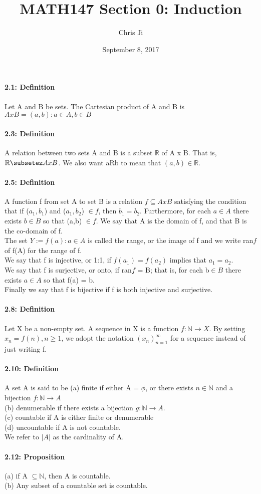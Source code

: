 \documentclass{article}
\title{MATH147 Section 0: Induction}  %
\author{Chris Ji}      %
\date{September 8, 2017}      %
\begin{document}
            

\maketitle     %

\paragraph{2.1: Definition}
Let A and B be sets. The Cartesian product of A and B is \\ 
$A x B = {(a,b): a \in A, b \in B}$

\paragraph{2.3: Definition}
A relation between two sets A and B is a subset $\mathbb{R}$ of A x B. That is, $\mathbb{R} \subsetez A x B$. We also want aRb to mean that $(a,b) \in \mathbb{R}$.

\paragraph{2.5: Definition}
A function f from set A to set B is a relation $f \subseteq A x B$ satisfying the condition that if ($a_1, b_1$) and ($a_1, b_2$) $\in f$, then $b_1 = b_2$. Furthermore, for each $a \in A$ there exists $b \in B$ so that (a,b) $\in f$. We say that A is the domain of f, and that B is the co-domain of f. \\
The set $Y:= {f(a): a \in A}$ is called the range, or the image of f and we write ran$f$ of f(A) for the range of f. \\
We say that f is injective, or 1:1, if $f(a_1) = f(a_2)$ implies that $a_1 = a_2$. \\ 
We say that f is surjective, or onto, if ran$f$ = B; that is, for each b$\in B$ there exists $a \in A$ so that f(a) = b. \\ 
Finally we say that f is bijective if f is both injective and surjective.

\paragraph{2.8: Definition}
Let X be a non-empty set. A sequence in X is a function $f: \mathbb{N} \rightarrow X$. By setting $x_n = f(n), n \geq 1$, we adopt the notation $(x_n)_{n=1}^\infty$ for a sequence instead of just writing f.

\paragraph{2.10: Definition}
A set A is said to be
(a) finite if either A = $\phi$, or there exists $n \in \mathbb{N}$ and a bijection $f: \mathbb{N} \rightarrow A$ \\
(b) denumerable if there exists a bijection $g: \mathbb{N} \rightarrow A$.\\ 
(c) countable if A is either finite or denumerable \\ 
(d) uncountable if A is not countable. \\ 
We refer to $|A|$ as the cardinality of A. 

\paragraph{2.12: Proposition}
(a) if A $\subseteq \mathbb{N}$, then A is countable.\\ 
(b) Any subset of a countable set is countable. 
\end{document}
